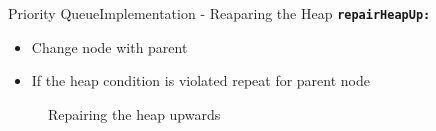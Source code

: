 \begin{frame}{Priority Queue}{Implementation - Reaparing the Heap}
  {\color{Mittel-Blau}\texttt{\textbf{repairHeapUp:}}}
  \begin{itemize}
    \item
      Change node with parent
    \item
      If the {\color{Mittel-Blau}heap condition} is violated repeat for parent
      node
  \end{itemize}
  \begin{center}
    \begin{figure}[!h]%
      \begin{columns}%
        \begin{column}{0.45\textwidth}%
          \begin{minipage}{\textwidth}%
            \begin{center}%
            \end{center}%
          \end{minipage}%
        \end{column}%
        \begin{column}{0.45\textwidth}%
          \begin{minipage}{\textwidth}%
            \begin{center}%
            \end{center}%
          \end{minipage}%
        \end{column}%
      \end{columns}%
      \caption{Repairing the heap upwards}%
      \label{fig:priority_queue:impl_repair_heap_up}%
    \end{figure}
  \end{center}
\end{frame}



